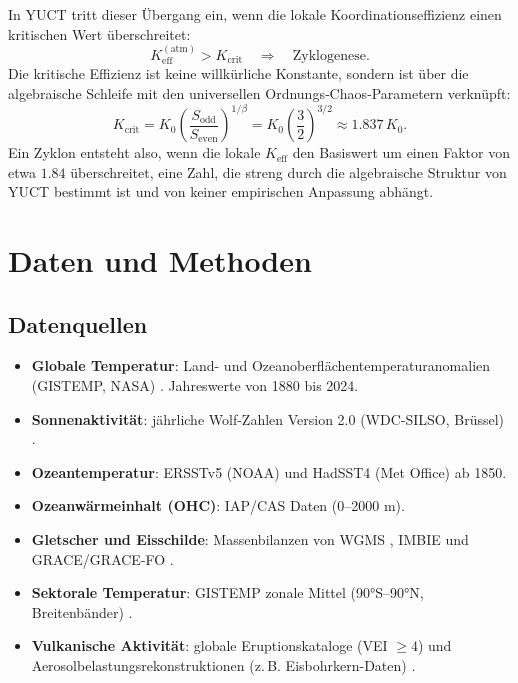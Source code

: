 \documentclass[12pt,a4paper]{article}
\newcommand{\Keff}{K_{\mathrm{eff}}}
\begin{document}
	In YUCT tritt dieser Übergang ein, wenn die lokale Koordinationseffizienz einen kritischen Wert überschreitet:
	\begin{equation}
		\Keff^{\mathrm{(atm)}} > K_{\mathrm{crit}} \quad \Longrightarrow \quad
		\text{Zyklogenese}.
	\end{equation}
	Die kritische Effizienz ist keine willkürliche Konstante, sondern ist über die algebraische Schleife mit den universellen Ordnungs‑Chaos‑Parametern verknüpft:
	\begin{equation}
		K_{\mathrm{crit}} = K_0 \left( \frac{S_{\mathrm{odd}}}{S_{\mathrm{even}}} \right)^{1/\beta}
		= K_0 \left( \frac{3}{2} \right)^{3/2} \approx 1.837\,K_0 .
	\end{equation}
	Ein Zyklon entsteht also, wenn die lokale \(K_{\mathrm{eff}}\) den Basiswert um einen Faktor von etwa \(1.84\) überschreitet, eine Zahl, die streng durch die algebraische Struktur von YUCT bestimmt ist und von keiner empirischen Anpassung abhängt.
	
	\section{Daten und Methoden}
	
	\subsection{Datenquellen}
	
	\begin{itemize}
		\item \textbf{Globale Temperatur}: Land- und Ozeanoberflächentemperaturanomalien (GISTEMP, NASA) \cite{GISTEMP}. Jahreswerte von 1880 bis 2024.
		\item \textbf{Sonnenaktivität}: jährliche Wolf-Zahlen Version 2.0 (WDC‑SILSO, Brüssel) \cite{SILSO}.
		\item \textbf{Ozeantemperatur}: ERSSTv5 (NOAA) und HadSST4 (Met Office) \cite{ERSST, HADSST} ab 1850.
		\item \textbf{Ozeanwärmeinhalt (OHC)}: IAP/CAS Daten \cite{IAPOHC} (0–2000 m).
		\item \textbf{Gletscher und Eisschilde}: Massenbilanzen von WGMS \cite{WGMS}, IMBIE \cite{IMBIE} und GRACE/GRACE-FO \cite{GRACE}.
		\item \textbf{Sektorale Temperatur}: GISTEMP zonale Mittel (90°S–90°N, Breitenbänder) \cite{GISTEMPZonal}.
		\item \textbf{Vulkanische Aktivität}: globale Eruptionskataloge (VEI \(\ge 4\)) und Aerosolbelastungsrekonstruktionen (z. B. Eisbohrkern-Daten) \cite{VolcanoCatalog}.
	\end{itemize}
	
\end{document}
